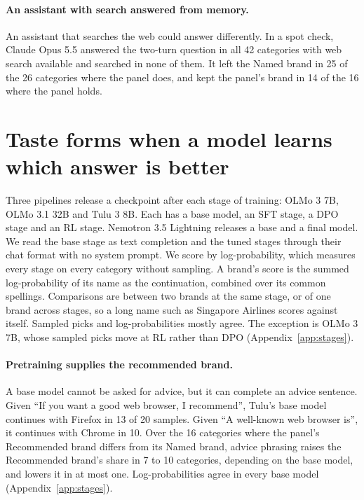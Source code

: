 \documentclass[11pt]{article}
\begin{document}
\paragraph{An assistant with search answered from memory.} An assistant that searches the web could answer differently. In a spot
check, Claude Opus 5.5 answered the two-turn question in all 42 categories with web search available and searched in
none of them. It left the Named brand in 25 of the 26 categories where the panel does, and kept the panel's brand in
14 of the 16 where the panel holds.

\section{Taste forms when a model learns which answer is better}
\label{sec:stages}

Three pipelines release a checkpoint after each stage of training: OLMo 3 7B, OLMo 3.1 32B and Tulu 3 8B. Each has a
base model, an SFT stage, a DPO stage and an RL stage. Nemotron 3.5 Lightning releases a base and a final model. We read
the base stage as text completion and the tuned stages through their chat format with no system prompt. We score by
log-probability, which measures every stage on every category without sampling. A brand's score is the summed
log-probability of its name as the continuation, combined over its common spellings. Comparisons are between two
brands at the same stage, or of one brand across stages, so a long name such as Singapore Airlines scores against
itself. Sampled picks and log-probabilities mostly agree. The exception is OLMo 3 7B, whose sampled picks move at RL
rather than DPO (Appendix~\ref{app:stages}).

\paragraph{Pretraining supplies the recommended brand.} A base model cannot be asked for advice, but it can complete an
advice sentence. Given ``If you want a good web browser, I recommend'', Tulu's base model continues with Firefox in 13
of 20 samples. Given ``A well-known web browser is'', it continues with Chrome in 10. Over the 16 categories where the
panel's Recommended brand differs from its Named brand, advice phrasing raises the Recommended brand's share in 7 to 10
categories, depending on the base model, and lowers it in at most one. Log-probabilities agree in every base model
(Appendix~\ref{app:stages}).
\end{document}
